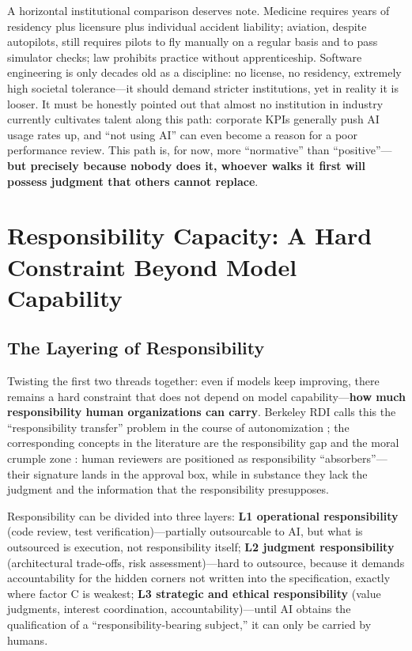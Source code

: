 \documentclass[11pt]{article}
\begin{document}
A horizontal institutional comparison deserves note. Medicine requires
years of residency plus licensure plus individual accident liability;
aviation, despite autopilots, still requires pilots to fly manually on a
regular basis and to pass simulator checks; law prohibits practice without
apprenticeship. Software engineering is only decades old as a discipline:
no license, no residency, extremely high societal tolerance---it should
demand stricter institutions, yet in reality it is looser. It must be
honestly pointed out that almost no institution in industry currently
cultivates talent along this path: corporate KPIs generally push AI usage
rates up, and ``not using AI'' can even become a reason for a poor
performance review. This path is, for now, more ``normative'' than
``positive''---\textbf{but precisely because nobody does it, whoever walks
it first will possess judgment that others cannot replace}.

\section{Responsibility Capacity: A Hard Constraint Beyond Model Capability}
\subsection{The Layering of Responsibility}
Twisting the first two threads together: even if models keep improving,
there remains a hard constraint that does not depend on model
capability---\textbf{how much responsibility human organizations can carry}.
Berkeley RDI calls this the ``responsibility transfer'' problem in the
course of autonomization \cite{berkeleyrdi}; the corresponding concepts in
the literature are the responsibility gap \cite{matthias} and the moral
crumple zone \cite{elish}: human reviewers are positioned as responsibility
``absorbers''---their signature lands in the approval box, while in
substance they lack the judgment and the information that the
responsibility presupposes.

Responsibility can be divided into three layers: \textbf{L1 operational
responsibility} (code review, test verification)---partially outsourcable
to AI, but what is outsourced is execution, not responsibility itself;
\textbf{L2 judgment responsibility} (architectural trade-offs, risk
assessment)---hard to outsource, because it demands accountability for the
hidden corners not written into the specification, exactly where factor C
is weakest; \textbf{L3 strategic and ethical responsibility} (value
judgments, interest coordination, accountability)---until AI obtains the
qualification of a ``responsibility-bearing subject,'' it can only be
carried by humans.
\end{document}
